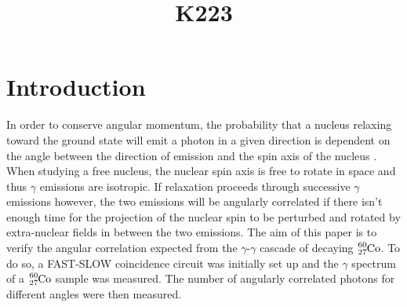 \documentclass[twocolumn]{article}
\title{K223}
\begin{document}
\maketitle
\newpage
\section{Introduction}
In order to conserve angular momentum, the probability that a nucleus relaxing toward the ground state will emit a photon in a given direction is dependent on the angle between the direction of emission and the spin axis of the nucleus \cite{sieg}. When studying a free nucleus, the nuclear spin axis is free to rotate in space and thus $\gamma$ emissions are isotropic. If relaxation proceeds through successive $\gamma$ emissions however, the two emissions will be angularly correlated if there isn't enough time for the projection of the nuclear spin to be perturbed and rotated by extra-nuclear fields in between the two emissions. The aim of this paper is to verify the angular correlation expected from the $\gamma$-$\gamma$ cascade of decaying $\ce{_27^{60}Co}$. To do so, a FAST-SLOW coincidence circuit was initially set up and the $\gamma$ spectrum of a $\ce{_27^{60}Co}$ sample was measured. The number of angularly correlated photons for different angles were then measured.
\end{document}
